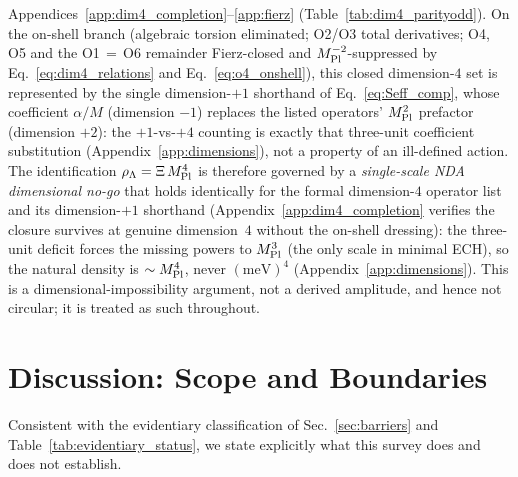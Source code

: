 \documentclass[aps,prd,twocolumn,superscriptaddress,showpacs,preprintnumbers,nofootinbib,longbibliography,floatfix]{revtex4-2}
\newcommand{\MPl}{M_{\rm Pl}}
\begin{document}
Appendices~\ref{app:dim4_completion}--\ref{app:fierz}
(Table~\ref{tab:dim4_parityodd}). On the on-shell branch (algebraic torsion eliminated; O2/O3 total
derivatives; O4, O5 and the O1$\,=\,$O6 remainder Fierz-closed and
$\MPl^{-2}$-suppressed by Eq.~\eqref{eq:dim4_relations} and
Eq.~\eqref{eq:o4_onshell}),
this closed dimension-$4$ set is represented by the single dimension-$+1$
shorthand of Eq.~\eqref{eq:Seff_comp}, whose coefficient $\alpha/M$
(dimension $-1$) replaces the listed operators' $\MPl^{2}$ prefactor
(dimension $+2$): the $+1$-vs-$+4$ counting is exactly that three-unit
coefficient substitution (Appendix~\ref{app:dimensions}), not a property
of an ill-defined action.
The identification $\rho_\Lambda = \Xi\,\MPl^4$ is therefore governed by a
\textit{single-scale NDA dimensional no-go} that holds identically for the
formal dimension-$4$ operator list and its dimension-$+1$ shorthand
(Appendix~\ref{app:dim4_completion} verifies the closure survives at genuine
dimension~$4$ without the on-shell dressing): the three-unit deficit forces
the missing powers to $\MPl^3$ (the only scale in minimal ECH), so the
natural density is $\sim\MPl^4$, never $(\text{meV})^4$
(Appendix~\ref{app:dimensions}). This is a dimensional-impossibility
argument, not a derived amplitude, and hence not circular; it is treated as
such throughout.

\section{Discussion: Scope and Boundaries}\label{sec:scope}

Consistent with the evidentiary classification of Sec.~\ref{sec:barriers}
and Table~\ref{tab:evidentiary_status}, we state explicitly what this
survey does and does not establish.
\end{document}

